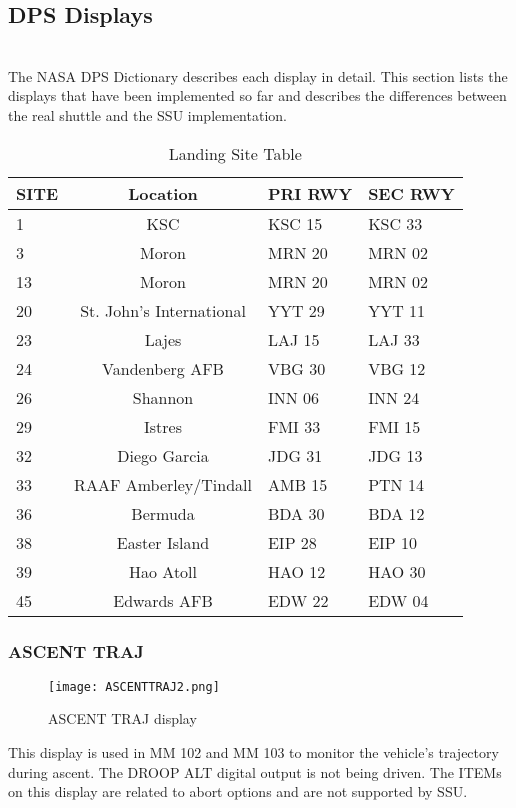 \documentclass[Space_Shuttle_Ultra_Manual.tex]{subfiles}
\begin{document}
\subsection{DPS Displays}
\begin{multicols*}{2}
\renewcommand{\cfttoctitlefont}{\bf}
\localtableofcontents
\label{sec:dps-displays}
\noindent
\\
The NASA DPS Dictionary describes each display in detail. This section lists the displays that have been implemented so far and describes the differences between the real shuttle and the SSU implementation.

\begin{table*}[tb]
  \centering
  \begin{tabular}{l | c l l}
    \textbf{SITE} & \textbf{Location} & \textbf{PRI RWY} & \textbf{SEC RWY} \\
    \hline
    1 & KSC & KSC 15 & KSC 33 \\
    3 & Moron & MRN 20 & MRN 02 \\
    13 & Moron & MRN 20 & MRN 02 \\
    20 & St. John's International & YYT 29 & YYT 11 \\
    23 & Lajes & LAJ 15 & LAJ 33 \\
    24 & Vandenberg AFB & VBG 30 & VBG 12 \\
		26 & Shannon & INN 06 & INN 24 \\
    29 & Istres & FMI 33 & FMI 15 \\
    32 & Diego Garcia & JDG 31 & JDG 13 \\
    33 & RAAF Amberley/Tindall & AMB 15 & PTN 14 \\
    36 & Bermuda & BDA 30 & BDA 12 \\
    38 & Easter Island & EIP 28 & EIP 10 \\
    39 & Hao Atoll & HAO 12 & HAO 30 \\
    45 & Edwards AFB & EDW 22 & EDW 04
  \end{tabular}
  \caption{Landing Site Table}
  \label{tab:LandingSites}
\end{table*}

\subsubsection{ASCENT TRAJ}
\begin{figure}[H]
  \texttt{[image: ASCENTTRAJ2.png]}
  \caption{ASCENT TRAJ display}
  \label{fig:ASCENT_TRAJ}
\end{figure}
This display is used in MM 102 and MM 103 to monitor the vehicle's trajectory during ascent. The DROOP ALT digital output is not being driven. The ITEMs on this display are related to abort options and are not supported by SSU.


\end{multicols*}
\end{document}
